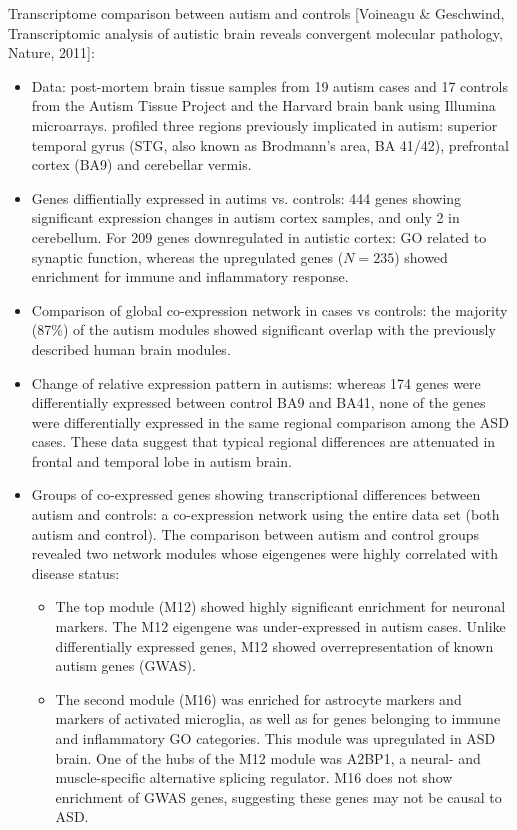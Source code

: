 \documentclass{report}
\begin{document}
Transcriptome comparison between autism and controls [Voineagu \& Geschwind, Transcriptomic analysis of autistic brain reveals convergent molecular pathology, Nature, 2011]: 
\begin{itemize}
	\item Data: post-mortem brain tissue samples from 19 autism cases and 17 controls from the Autism Tissue Project and the Harvard brain bank using Illumina microarrays. profiled three regions previously implicated in autism: superior temporal gyrus (STG, also known as Brodmann's area, BA 41/42), prefrontal cortex (BA9) and cerebellar vermis. 
	
	\item Genes diffientially expressed in autims vs. controls: 444 genes showing significant expression changes in autism cortex samples, and only 2 in cerebellum.  For 209 genes downregulated in autistic cortex: GO related to synaptic function, whereas the upregulated genes ($N = 235$) showed enrichment for immune and inflammatory response. 
	
	\item Comparison of global co-expression network in cases vs controls: the majority (87\%) of the autism modules showed significant overlap with the previously described human brain modules. 
	
	\item Change of relative expression pattern in autisms: whereas 174 genes were differentially expressed between control BA9 and BA41, none of the genes were differentially expressed in the same regional comparison among the ASD cases. These data suggest that typical regional differences are attenuated in frontal and temporal lobe in autism brain. 
	
	\item Groups of co-expressed genes showing transcriptional differences between autism and controls: a co-expression network using the entire data set (both autism and control). The comparison between autism and control groups revealed two network modules whose eigengenes were highly correlated with disease status: 
	\begin{itemize}
		\item The top module (M12) showed highly significant enrichment for neuronal markers. The M12 eigengene was under-expressed in autism cases. Unlike differentially expressed genes, M12 showed overrepresentation of known autism genes (GWAS). 
		
		\item The second module (M16) was enriched for astrocyte markers and markers of activated microglia, as well as for genes belonging to immune and inflammatory GO categories. This module was upregulated in ASD brain. One of the hubs of the M12 module was A2BP1, a neural- and muscle-specific alternative splicing regulator.  M16 does not show enrichment of GWAS genes, suggesting these genes may not be causal to ASD. 
	\end{itemize}
	
\end{itemize}
\end{document}
